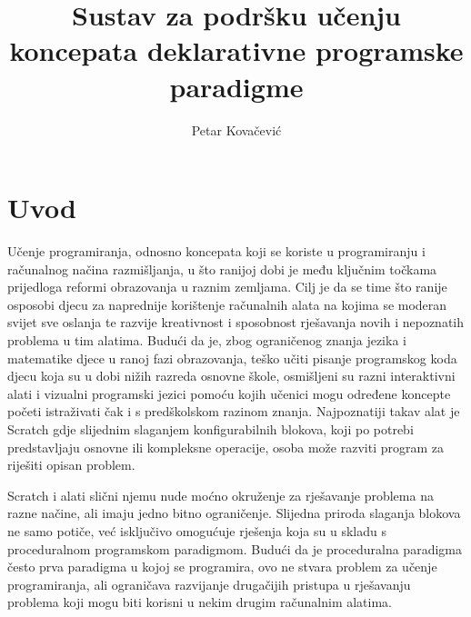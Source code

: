 \documentclass[times, utf8, diplomski, numeric]{fer}
\begin{document}

\title{Sustav za podršku učenju koncepata deklarativne programske paradigme}

\author{Petar Kovačević}

\maketitle



\zahvala{}

\tableofcontents



\chapter{Uvod}

Učenje programiranja, odnosno koncepata koji se koriste u programiranju i računalnog načina razmišljanja, u što ranijoj dobi je među ključnim točkama prijedloga reformi obrazovanja u raznim zemljama.
Cilj je da se time što ranije osposobi djecu za naprednije korištenje računalnih alata na kojima se moderan svijet sve oslanja te razvije kreativnost i sposobnost rješavanja novih i nepoznatih problema u tim alatima.
Budući da je, zbog ograničenog znanja jezika i matematike djece u ranoj fazi obrazovanja, teško učiti pisanje programskog koda djecu koja su u dobi nižih razreda osnovne škole, osmišljeni su razni interaktivni alati i vizualni programski jezici pomoću kojih učenici mogu određene koncepte početi istraživati čak i s predškolskom razinom znanja.
Najpoznatiji takav alat je Scratch gdje slijednim slaganjem konfigurabilnih blokova, koji po potrebi predstavljaju osnovne ili kompleksne operacije, osoba može razviti program za riješiti opisan problem\citep{scratch}.

Scratch i alati slični njemu nude moćno okruženje za rješavanje problema na razne načine, ali imaju jedno bitno ograničenje.
Slijedna priroda slaganja blokova ne samo potiče, već isključivo omogućuje rješenja koja su u skladu s proceduralnom programskom paradigmom.
Budući da je proceduralna paradigma često prva paradigma u kojoj se programira, ovo ne stvara problem za učenje programiranja, ali ograničava razvijanje drugačijih pristupa u rješavanju problema koji mogu biti korisni u nekim drugim računalnim alatima.
\end{document}
